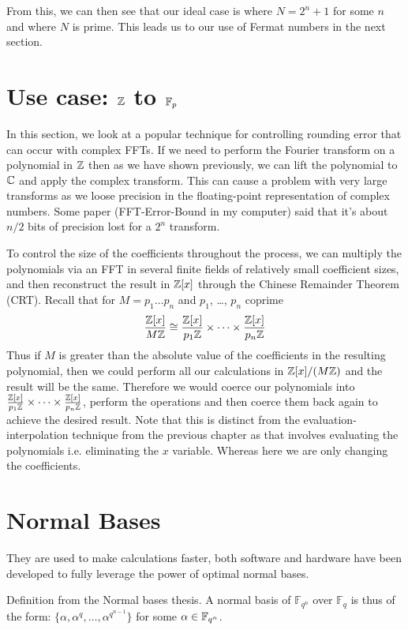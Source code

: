 From this, we can then see that our ideal case is where $N = 2^n + 1$ for some $n$ and where $N$ is prime. This leads us to our use of Fermat numbers in the next section.

\section{Use case: ${\mathbb Z}$ to $\mathbb{F}_p$}\label{sec:Z-Fp}

In this section, we look at a popular technique for controlling rounding error that can occur with complex FFTs. If we need to perform the Fourier transform on a polynomial in ${\mathbb Z}$ then as we have shown previously, we can lift the polynomial to $\mathbb{C}$ and apply the complex transform. This can cause a problem with very large transforms as we loose precision in the floating-point representation of complex numbers. Some paper (FFT-Error-Bound in my computer) said that it's about $n / 2$ bits of precision lost for a $2^n$ transform. 

To control the size of the coefficients throughout the process, we can multiply the polynomials via an FFT in several finite fields of relatively small coefficient sizes, and then reconstruct the result in ${\mathbb Z}[x]$ through the Chinese Remainder Theorem (CRT). Recall that for $M = p_1\ldots p_n$ and $p_1$, \ldots, $p_n$ coprime
\[
    \frac{{\mathbb Z}[x]}{M{\mathbb Z}} \cong \frac{{\mathbb Z}[x]}{p_1{\mathbb Z}} \times \cdots \times \frac{{\mathbb Z}[x]}{p_n{\mathbb Z}}
\]
Thus if $M$ is greater than the absolute value of the coefficients in the resulting polynomial, then we could perform all our calculations in ${\mathbb Z}[x]/(M {\mathbb Z})$ and the result will be the same. Therefore we would coerce our polynomials into $\frac{{\mathbb Z}[x]}{p_1{\mathbb Z}} \times \cdots \times \frac{{\mathbb Z}[x]}{p_n{\mathbb Z}}$, perform the operations and then coerce them back again to achieve the desired result. Note that this is distinct from the evaluation-interpolation technique from the previous chapter as that involves evaluating the polynomials i.e. eliminating the $x$ variable. Whereas here we are only changing the coefficients.

\section{Normal Bases}
They are used to make calculations faster,  both software and hardware have been developed to fully leverage the power of optimal normal bases.

Definition from the Normal bases thesis.
A normal basis of $\mathbb{F}_{q^n}$ over $\mathbb{F}_q$ is thus of the form: $\{\alpha,\alpha^q,\ldots ,\alpha^{q^{n-1}}\}$ for some $\alpha \in \mathbb{F}_{q^n}$.

